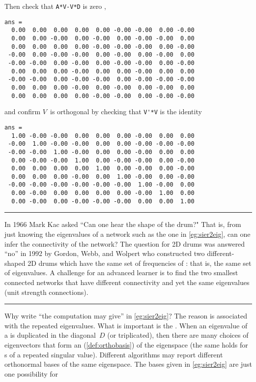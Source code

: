 \begin{example}
\begin{solution}
\begin{itemize}
\end{itemize}
Then check that \verb|A*V-V*D| is zero \twodp,
{\small%
\begin{verbatim}
ans =
  0.00  0.00  0.00  0.00  0.00 -0.00 -0.00  0.00 -0.00
  0.00  0.00 -0.00  0.00 -0.00  0.00 -0.00 -0.00  0.00
  0.00  0.00  0.00  0.00 -0.00 -0.00 -0.00  0.00 -0.00
 -0.00  0.00 -0.00 -0.00  0.00 -0.00  0.00 -0.00  0.00
 -0.00 -0.00  0.00 -0.00  0.00 -0.00 -0.00  0.00 -0.00
  0.00  0.00  0.00 -0.00  0.00  0.00 -0.00  0.00  0.00
 -0.00 -0.00  0.00 -0.00 -0.00  0.00 -0.00 -0.00 -0.00
  0.00  0.00  0.00 -0.00  0.00 -0.00  0.00 -0.00  0.00
  0.00  0.00  0.00  0.00 -0.00 -0.00  0.00 -0.00 -0.00
\end{verbatim}
}
and confirm \(V\)~is orthogonal by checking that \verb|V'*V| is the identity \twodp
{\small%
\begin{verbatim}
ans =
  1.00 -0.00 -0.00  0.00  0.00  0.00 -0.00  0.00  0.00
 -0.00  1.00 -0.00 -0.00  0.00  0.00 -0.00 -0.00 -0.00
 -0.00 -0.00  1.00 -0.00  0.00  0.00 -0.00  0.00  0.00
  0.00 -0.00 -0.00  1.00  0.00 -0.00 -0.00  0.00 -0.00
  0.00  0.00  0.00  0.00  1.00  0.00 -0.00  0.00 -0.00
  0.00  0.00  0.00 -0.00  0.00  1.00 -0.00  0.00 -0.00
 -0.00 -0.00 -0.00 -0.00 -0.00 -0.00  1.00 -0.00  0.00
  0.00 -0.00  0.00  0.00  0.00  0.00 -0.00  1.00  0.00
  0.00 -0.00  0.00 -0.00 -0.00 -0.00  0.00  0.00  1.00
\end{verbatim}
}
\end{solution}
\end{example}


\begin{table}\centering\sl
\hrule\smallskip
\begin{minipage}{\linewidth}
In 1966 Mark Kac asked ``Can one hear the shape of the drum?"
That is, from just knowing the eigenvalues of a network such as the one in \cref{eg:sier2eig}, can one infer the connectivity of the network?
The question for 2D drums was answered ``no'' in 1992 by Gordon, Webb, and Wolpert who constructed two different-shaped 2D drums which have the same set of frequencies of : that is, the same set of eigenvalues.
A challenge for an advanced learner is to find the two smallest connected networks that have different connectivity and yet the same eigenvalues (unit strength connections).
\end{minipage}
\smallskip\hrule
\end{table}

Why write ``the computation may give'' in \cref{eg:sier2eig}?  
The reason is associated with the repeated eigenvalues.
What is important is the .
When an eigenvalue of a  is duplicated in the diagonal~\(D\) (or triplicated), then there are many choices of eigenvectors that form an  (\cref{def:orthobasis}) of the eigenspace (the same holds for s of a repeated singular value).
Different algorithms may report different orthonormal bases of the same eigenspace.
The bases given in \cref{eg:sier2eig} are just one possibility for 




